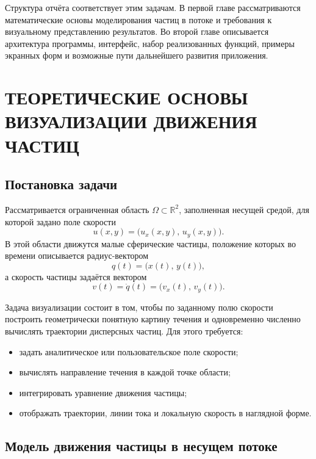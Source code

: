 \documentclass[14pt,a4paper]{extarticle}
\numberwithin{figure}{section}
\numberwithin{table}{section}
\begin{document}
Структура отчёта соответствует этим задачам. В первой главе рассматриваются
математические основы моделирования частиц в потоке и требования к визуальному
представлению результатов. Во второй главе описывается архитектура программы,
интерфейс, набор реализованных функций, примеры экранных форм и возможные пути
дальнейшего развития приложения.

\newpage
\section{ТЕОРЕТИЧЕСКИЕ ОСНОВЫ ВИЗУАЛИЗАЦИИ ДВИЖЕНИЯ ЧАСТИЦ}

\subsection{Постановка задачи}

Рассматривается ограниченная область $\Omega \subset \mathbb{R}^2$, заполненная
несущей средой, для которой задано поле скорости
\begin{equation}
    u(x, y) = \bigl(u_x(x, y),\,u_y(x, y)\bigr).
\end{equation}
В этой области движутся малые сферические частицы, положение которых во времени
описывается радиус-вектором
\begin{equation}
    q(t) = \bigl(x(t),\,y(t)\bigr),
\end{equation}
а скорость частицы задаётся вектором
\begin{equation}
    v(t) = \dot q(t) = \bigl(v_x(t),\,v_y(t)\bigr).
\end{equation}

Задача визуализации состоит в том, чтобы по заданному полю скорости построить
геометрически понятную картину течения и одновременно численно вычислять
траектории дисперсных частиц. Для этого требуется:
\begin{itemize}
    \item задать аналитическое или пользовательское поле скорости;
    \item вычислять направление течения в каждой точке области;
    \item интегрировать уравнение движения частицы;
    \item отображать траектории, линии тока и локальную скорость в наглядной форме.
\end{itemize}

\subsection{Модель движения частицы в несущем потоке}
\end{document}
